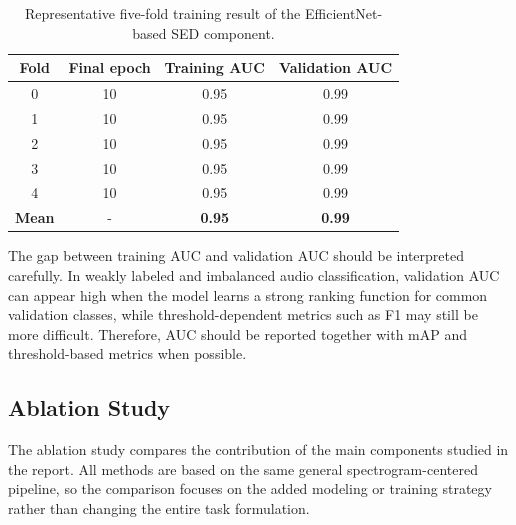 \documentclass[a4paper,12pt]{article}
\begin{document}
\begin{table}[H]
\centering
\caption{Representative five-fold training result of the EfficientNet-based SED component.}
\begin{tabular}{c c c c}
\toprule
\textbf{Fold} & \textbf{Final epoch} & \textbf{Training AUC} & \textbf{Validation AUC} \\
\midrule
0 & 10 & 0.95 & 0.99 \\
1 & 10 & 0.95 & 0.99 \\
2 & 10 & 0.95 & 0.99 \\
3 & 10 & 0.95 & 0.99 \\
4 & 10 & 0.95 & 0.99 \\
\midrule
\textbf{Mean} & - & \textbf{0.95} & \textbf{0.99} \\
\bottomrule
\end{tabular}
\end{table}

The gap between training AUC and validation AUC should be interpreted carefully. In weakly labeled and imbalanced audio classification, validation AUC can appear high when the model learns a strong ranking function for common validation classes, while threshold-dependent metrics such as F1 may still be more difficult. Therefore, AUC should be reported together with mAP and threshold-based metrics when possible.

\subsection{Ablation Study}
The ablation study compares the contribution of the main components studied in the report. All methods are based on the same general spectrogram-centered pipeline, so the comparison focuses on the added modeling or training strategy rather than changing the entire task formulation.
\end{document}
